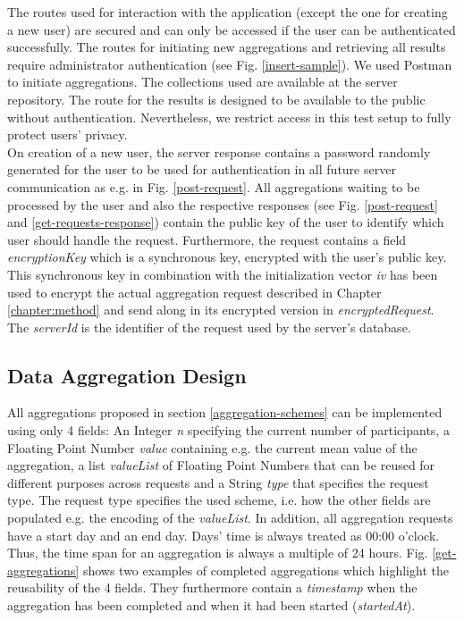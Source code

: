 The routes used for interaction with the application (except the one for creating a new user) are secured and can only be accessed if the user can be authenticated successfully. The routes for initiating new aggregations and retrieving all results require administrator authentication (see Fig. \ref{insert-sample}). We used Postman \parencite{postman} to initiate aggregations. The collections used are available at the server repository. The route for the results is designed to be available to the public without authentication. Nevertheless, we restrict access in this test setup to fully protect users' privacy.\\
On creation of a new user, the server response contains a password randomly generated for the user to be used for authentication in all future server communication as e.g. in Fig. \ref{post-request}. All aggregations waiting to be processed by the user and also the respective responses (see Fig. \ref{post-request} and \ref{get-requests-response}) contain the public key of the user to identify which user should handle the request. Furthermore, the request contains a field \textit{encryptionKey} which is a synchronous key, encrypted with the user's public key. This synchronous key in combination with the initialization vector \textit{iv} has been used to encrypt the actual aggregation request described in Chapter \ref{chapter:method} and send along in its encrypted version in \textit{encryptedRequest}. The \textit{serverId} is the identifier of the request used by the server's database.


\subsection{Data Aggregation Design}\label{data-aggregation-design}
All aggregations proposed in section \ref{aggregation-schemes} can be implemented using only 4 fields: An Integer \textit{n} specifying the current number of participants, a Floating Point Number \textit{value} containing e.g. the current mean value of the aggregation, a list \textit{valueList} of Floating Point Numbers that can be reused for different purposes across requests and a String \textit{type} that specifies the request type. The request type specifies the used scheme, i.e. how the other fields are populated e.g. the encoding of the \textit{valueList}. In addition, all aggregation requests have a start day and an end day. Days' time is always treated as 00:00 o'clock. Thus, the time span for an aggregation is always a multiple of 24 hours. Fig. \ref{get-aggregations} shows two examples of completed aggregations which highlight the reusability of the 4 fields. They furthermore contain a \textit{timestamp} when the aggregation has been completed and when it had been started (\textit{startedAt}).\\

